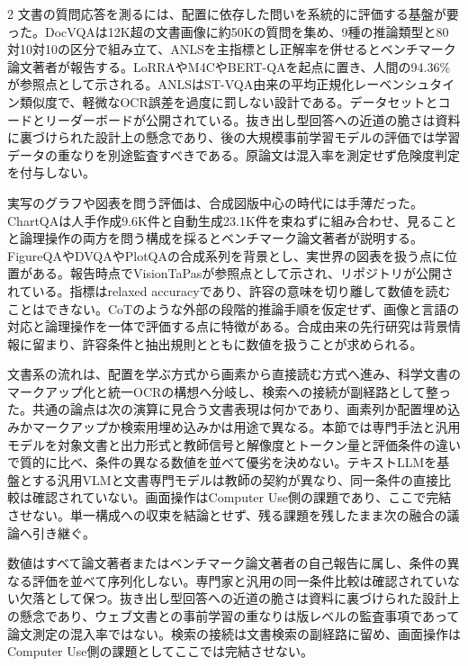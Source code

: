 \documentclass[lualatex,a4paper,10pt]{jlreq}
\begin{document}
\begin{multicols}{2}
\noindent 文書の質問応答を測るには、配置に依存した問いを系統的に評価する基盤が要った。DocVQAは12K超の文書画像に約50Kの質問を集め、9種の推論類型と80対10対10の区分で組み立て、ANLSを主指標とし正解率を併せるとベンチマーク論文著者が報告する。LoRRAやM4CやBERT-QAを起点に置き、人間の94.36\%が参照点として示される。ANLSはST-VQA由来の平均正規化レーベンシュタイン類似度で、軽微なOCR誤差を過度に罰しない設計である。データセットとコードとリーダーボードが公開されている。抜き出し型回答への近道の脆さは資料に裏づけられた設計上の懸念であり、後の大規模事前学習モデルの評価では学習データの重なりを別途監査すべきである。原論文は混入率を測定せず危険度判定を付与しない。\autocite{vmd108}\par\medskip
\noindent 実写のグラフや図表を問う評価は、合成図版中心の時代には手薄だった。ChartQAは人手作成9.6K件と自動生成23.1K件を束ねずに組み合わせ、見ることと論理操作の両方を問う構成を採るとベンチマーク論文著者が説明する。FigureQAやDVQAやPlotQAの合成系列を背景とし、実世界の図表を扱う点に位置がある。報告時点でVisionTaPasが参照点として示され、リポジトリが公開されている。指標はrelaxed accuracyであり、許容の意味を切り離して数値を読むことはできない。CoTのような外部の段階的推論手順を仮定せず、画像と言語の対応と論理操作を一体で評価する点に特徴がある。合成由来の先行研究は背景情報に留まり、許容条件と抽出規則とともに数値を扱うことが求められる。\autocite{vmd109}\par\medskip
\noindent 文書系の流れは、配置を学ぶ方式から画素から直接読む方式へ進み、科学文書のマークアップ化と統一OCRの構想へ分岐し、検索への接続が副経路として整った。共通の論点は次の演算に見合う文書表現は何かであり、画素列か配置埋め込みかマークアップか検索用埋め込みかは用途で異なる。本節では専門手法と汎用モデルを対象文書と出力形式と教師信号と解像度とトークン量と評価条件の違いで質的に比べ、条件の異なる数値を並べて優劣を決めない。テキストLLMを基盤とする汎用VLMと文書専門モデルは教師の契約が異なり、同一条件の直接比較は確認されていない。画面操作はComputer Use側の課題であり、ここで完結させない。単一構成への収束を結論とせず、残る課題を残したまま次の融合の議論へ引き継ぐ。\autocite{vmd023,vmd026,vmd028}\par\medskip
\end{multicols}
\begin{claimboundary}[本節の読解上の境界]
\noindent 数値はすべて論文著者またはベンチマーク論文著者の自己報告に属し、条件の異なる評価を並べて序列化しない。専門家と汎用の同一条件比較は確認されていない欠落として保つ。抜き出し型回答への近道の脆さは資料に裏づけられた設計上の懸念であり、ウェブ文書との事前学習の重なりは版レベルの監査事項であって論文測定の混入率ではない。検索の接続は文書検索の副経路に留め、画面操作はComputer Use側の課題としてここでは完結させない。\autocite{vmd023,vmd024,vmd025,vmd026,vmd027,vmd028,vmd029,vmd108,vmd109}\par
\end{claimboundary}
\end{document}
